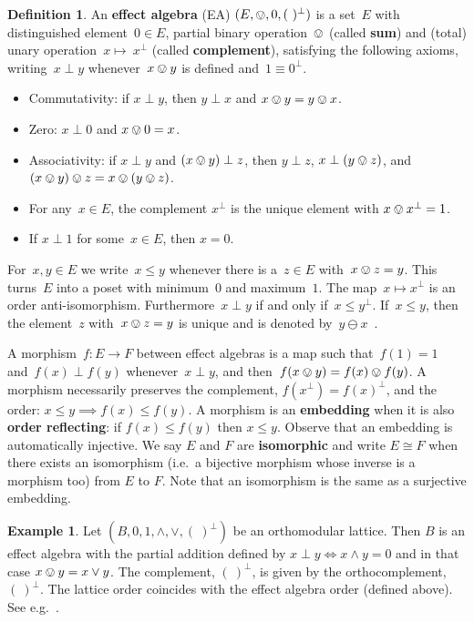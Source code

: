 \documentclass[10pt,conference]{IEEEtran}
\newcommand\Define[1]{\textbf{#1}}
\newcounter{counter}
\theoremstyle{definition}
\newtheorem{definition}[counter]{Definition}
\newtheorem{example}[counter]{Example}
\begin{document}
\begin{definition}
    An \Define{effect algebra}
    (EA) $(E, \ovee, 0, (\ )^\perp)$ is a set~$E$ with
    distinguished element~$0 \in E$,
    partial binary operation~$\ovee$ (called \Define{sum})
    and (total) unary operation~$x \mapsto~x^\perp$ (called \Define{complement}),
    satisfying the following axioms,
    writing~$x\perp y$ whenever~$x \ovee y$ is defined
        and~$1 \equiv 0^\perp$.
\begin{itemize}
\item Commutativity: if $x\perp y$, then $y \perp x$ and $x\ovee y = y \ovee x$.
\item Zero: $x\perp 0$ and $x\ovee 0 = x$.
\item Associativity: if $x\perp y$ and $(x\ovee y)\perp z$, then
    $y\perp z$,
$x\perp (y \ovee z)$, and $(x\ovee y) \ovee z = x\ovee (y\ovee z)$.
\item For any~$x \in E$, the complement
    $x^\perp$ is the unique element with $x \ovee x^\perp = 1$.
        
\item If $x\perp 1$ for some~$x\in E$, then $x=0$.
\end{itemize}

For~$x,y \in E$ we write~$x \leq y$ whenever there is a~$z \in E$
    with~$x \ovee z = y$.
This turns~$E$ into a poset with minimum~$0$ and maximum~$1$.
The map~$x \mapsto x^\perp$ is an order anti-isomorphism.
Furthermore~$x \perp y$ if and only if~$x \leq y^\perp$.
If~$x \leq y$, then the element~$z$ with~$x \ovee z = y$
    is unique and is denoted by~$y \ominus x$~\cite{foulis1994effect}.

A morphism~$f\colon E \to F$ between effect algebras
    is a map such that~$f(1)=1$
        and~$f(x) \perp f(y)$ whenever~$x \perp y$,
            and then~$f(x \ovee y) = f(x) \ovee f(y)$.
    A morphism necessarily preserves the complement, $f(x^\perp) = f(x)^\perp$,
    and the order: $x\leq y \implies f(x)\leq f(y)$.
    A morphism is an \Define{embedding} when it is also \Define{order reflecting}:
    if $f(x)\leq f(y)$ then $x\leq y$.
    Observe that an embedding is automatically injective.
    We say $E$ and $F$ are \Define{isomorphic} and write $E\cong F$ when 
    there exists an isomorphism (i.e.~a bijective morphism whose inverse is a morphism too) from $E$ to $F$.
    Note that an isomorphism is the same as a surjective embedding.
\end{definition}

\begin{example}\label{ex:orthomodularlattice}
    Let $(B,0,1,\wedge, \vee, (\ )^\perp)$ be an orthomodular lattice. Then $B$ is an effect algebra with the partial addition defined by 
    $x\perp y \iff x\wedge y = 0$ and in that case  $x\ovee y = x\vee y$. The complement, $(\ )^\perp$, is given by the orthocomplement, $(\ )^\perp$.
    The lattice order coincides with the effect algebra order (defined
    above). See e.g.~\cite[Prop.~27]{basmaster}.
\end{example}
\end{document}
